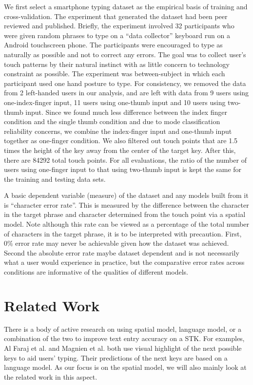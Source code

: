 \documentclass{sigchi}
\begin{document}
We first select a smartphone typing dataset as the empirical basis of training and cross-validation. The experiment that generated the dataset had been peer reviewed and published. Briefly, the experiment involved 32 participants who were given random phrases to type on a “data collector” keyboard run on a Android touchscreen phone.  The participants were encouraged to type as naturally as possible and not to correct any errors. The goal was to collect user’s touch patterns by their natural instinct with as little concern to technology constraint as possible. The experiment was between-subject in which each participant used one hand posture to type. For consistency, we removed the data from 2 left-handed users in our analysis, and are left with data from 9 users using one-index-finger input, 11 users using one-thumb input and
10 users using two-thumb input.  Since we found much less difference between the index finger condition and the single thumb condition and due to mode classification reliability concerns, we combine the index-finger input and one-thumb input together as one-finger condition. We also filtered out touch points that are 1.5 times the height of the key away from the center of the target key. After this, there are 84292 total touch points. For all evaluations, the ratio of the number of users using one-finger input to that using two-thumb input is kept the same for the training and testing data sets. 

A basic dependent variable (measure) of the dataset and any models built from it is “character error rate”. This is measured by the difference between the character in the target phrase and character determined from the touch point via a spatial model. Note although this rate can be viewed as a percentage of the total number of characters in the target phrase, it is to be interpreted with precaution. First, 0\% error rate may never be achievable given how the dataset was achieved. Second the absolute error rate maybe dataset dependent and is not necessarily what a user would experience in practice, but the comparative error rates across conditions are informative of the qualities of different models.

\section{Related Work}

There is a body of active research on using spatial model, language model, or a combination
of the two to improve text entry accuracy on a STK. For examples, 
Al Faraj et al. \cite{AlFaraj:2009} and Magnien et al. \cite{Magnien:2004} both use
visual highlight of the next possible keys to aid users' typing. Their predictions of the next keys are based on a language model. As our focus is on the 
spatial model, we will also mainly look at the related work in this aspect.    
\end{document}
